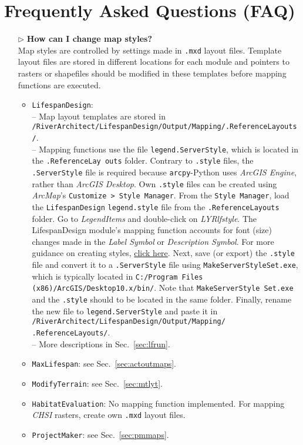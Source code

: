 \newpage
\part{Frequently Asked Questions (FAQ)} \label{part:faq}

\begin{itemize}	
	\item[$\triangleright$] \textbf{How can I change map styles?}\\
	Map styles are controlled by settings made in \texttt{.mxd} layout files. Template layout files are stored in different locations for each module and pointers to rasters or shapefiles should be modified in these templates before mapping functions are executed.
	\begin{itemize}
		\item \texttt{LifespanDesign}:\\
		-- Map layout templates are stored in \texttt{/RiverArchitect/LifespanDesign/Output/Mapping/.ReferenceLayouts/}.\\
		-- Mapping functions use the file \texttt{legend.ServerStyle}, which is located in the \texttt{.ReferenceLay outs} folder. Contrary to \texttt{.style} files, the \texttt{.ServerStyle} file is required because \texttt{arcpy}-Python uses \textit{ArcGIS Engine}, rather than \textit{ArcGIS Desktop}. Own \texttt{.style} files can be created using \textit{ArcMap}'s \texttt{Customize > Style Manager}. From the \texttt{Style Manager}, load the \texttt{LifespanDesign} \texttt{legend.style} file from the \texttt{.ReferenceLayouts} folder. Go to \textit{LegendItems} and double-click on \textit{LYR{\myUnderscore}lf{\myUnderscore}style}. The LifespanDesign module's mapping function accounts for font (size) changes made in the \textit{Label Symbol} or \textit{Description Symbol}. For more guidance on creating styles, \href{http://desktop.arcgis.com/en/arcmap/latest/map/styles-and-symbols/creating-new-styles.htm}{click here}. Next, save (or export) the \texttt{.style} file and convert it to a \texttt{.ServerStyle} file using \texttt{MakeServerStyleSet.exe}, which is typically located in \texttt{C:/Program Files (x86)/ArcGIS/Desktop10.x/bin/}. Note that \texttt{MakeServerStyle Set.exe} and the \texttt{.style} should to be located in the same folder. Finally, rename the new file to \texttt{legend.ServerStyle} and paste it in \texttt{/RiverArchitect/LifespanDesign/Output/Mapping/ .ReferenceLayouts/}.\\
		-- More descriptions in Sec.~\ref{sec:lfrun}.\\
		\item \texttt{MaxLifespan}: see Sec.~\ref{sec:actoutmaps}.
		\item \texttt{ModifyTerrain}: see Sec.~\ref{sec:mtlyt}.
		\item \texttt{HabitatEvaluation}: No mapping function implemented. For mapping \textit{CHSI} rasters, create own \texttt{.mxd} layout files.
		\item \texttt{ProjectMaker}: see Sec.~\ref{sec:pmmaps}.
	\end{itemize}
	

\end{itemize}
